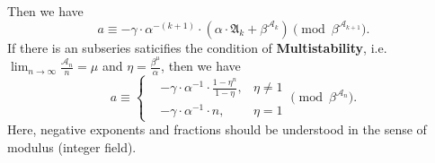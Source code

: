 \documentclass[a4paper,11pt]{article}
\theoremstyle{sltheorem}
\begin{document}
Then we have
\[ a \equiv - \gamma \cdot \alpha^{-(k + 1)} \cdot (\alpha\cdot\mathfrak{A}_{k} + \beta^{\mathcal{A}_{k}}) \pmod{\beta^{\mathcal{A}_{k+1}}}. \]
If there is an subseries saticifies the condition of \textbf{Multistability}, i.e. $\lim_{n\to\infty} \frac{\mathcal{A}_n}{n} = \mu$ and $\eta = \frac{\beta^\mu}{\alpha}$, then we have
\[a \equiv \left\{\begin{aligned}
& - \gamma \cdot \alpha^{-1} \cdot \frac{1 - \eta^{n}}{1 - \eta}, &\eta \ne 1 \\
& - \gamma \cdot \alpha^{-1} \cdot n , &\eta = 1
\end{aligned}\right. \pmod{\beta^{\mathcal{A}_{n}}}.\]
Here, negative exponents and fractions should be understood in the sense of modulus (integer field).
\end{document}
